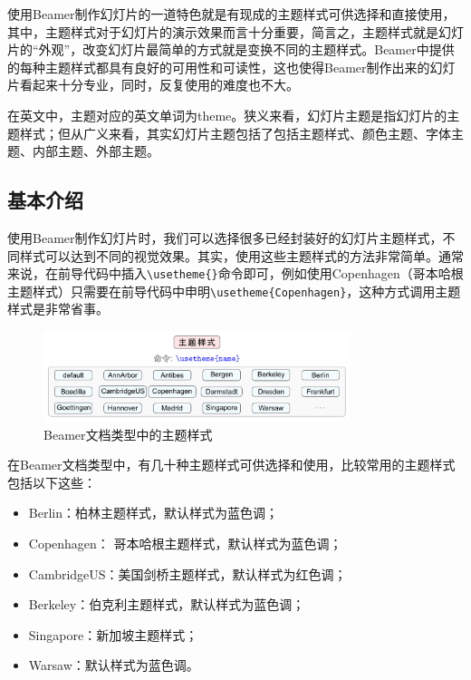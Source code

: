 使用Beamer制作幻灯片的一道特色就是有现成的主题样式可供选择和直接使用，其中，主题样式对于幻灯片的演示效果而言十分重要，简言之，主题样式就是幻灯片的“外观”，改变幻灯片最简单的方式就是变换不同的主题样式。Beamer中提供的每种主题样式都具有良好的可用性和可读性，这也使得Beamer制作出来的幻灯片看起来十分专业，同时，反复使用的难度也不大。

在英文中，主题对应的英文单词为theme。狭义来看，幻灯片主题是指幻灯片的主题样式；但从广义来看，其实幻灯片主题包括了包括主题样式、颜色主题、字体主题、内部主题、外部主题。

\subsection{基本介绍}

使用Beamer制作幻灯片时，我们可以选择很多已经封装好的幻灯片主题样式，不同样式可以达到不同的视觉效果。其实，使用这些主题样式的方法非常简单。通常来说，在前导代码中插入\texttt{\textbackslash{}usetheme\{\}}命令即可，例如使用Copenhagen（哥本哈根主题样式）只需要在前导代码中申明\texttt{\textbackslash{}usetheme\{Copenhagen\}}，这种方式调用主题样式是非常省事。

\begin{figure}[htbp]
    \centering
    \includegraphics[width = 0.8\textwidth]{images/ch_9/beamer_theme.pdf}
    \caption{Beamer文档类型中的主题样式}
    \label{fig:924}
\end{figure}

在Beamer文档类型中，有几十种主题样式可供选择和使用，比较常用的主题样式包括以下这些：
\begin{itemize}
    \item Berlin：柏林主题样式，默认样式为蓝色调；
    \item Copenhagen： 哥本哈根主题样式，默认样式为蓝色调；
    \item CambridgeUS：美国剑桥主题样式，默认样式为红色调；
    \item Berkeley：伯克利主题样式，默认样式为蓝色调；
    \item Singapore：新加坡主题样式；
    \item Warsaw：默认样式为蓝色调。
\end{itemize}

